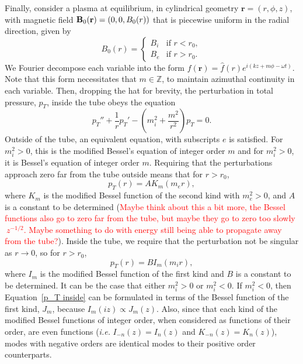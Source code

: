 \documentclass[12pt]{../style-files/ociamthesis}
\begin{document}
Finally, consider a plasma at equilibrium, in cylindrical geometry $\mathbf{r} = (r, \phi, z)$, with magnetic field $\mathbf{B}_0(\mathbf{r}) = (0, 0, B_0(r))$ that is piecewise uniform in the radial direction, given by
\begin{equation}
B_0(r) =
\begin{cases}
B_i & \text{if } r < r_0, \\
B_e & \text{if } r > r_0.
\end{cases}
\end{equation}
We Fourier decompose each variable into the form $f(\mathbf{r}) = \hat{f}(r)e^{i(kz + m\phi - \omega t)}$. Note that this form necessitates that $m \in \mathbb{Z}$, to maintain azimuthal continuity in each variable. Then, dropping the hat for brevity, the perturbation in total pressure, $p_T$, inside the tube obeys the equation
\begin{equation}
	p_T'' + \frac{1}{r}p_T' - (m_i^2 + \frac{m^2}{r^2})p_T = 0.
\end{equation}
Outside of the tube, an equivalent equation, with subscripts $e$ is satisfied. For $m_i^2 > 0$, this is the modified Bessel's equation of integer order $m$ and for $m_i^2 > 0$, it is Bessel's equation of integer order $m$. Requiring that the perturbations approach zero far from the tube outside means that for $r > r_0$,
\begin{equation}
	p_T(r) = A K_m(m_e r), \label{p_T outside}
\end{equation}
where $K_m$ is the modified Bessel function of the second kind with $m_e^2 > 0$, and $A$ is a constant to be determined (\textcolor{red}{Maybe think about this a bit more, the Bessel functions also go to zero far from the tube, but maybe they go to zero too slowly $~z^{-1/2}$. Maybe something to do with energy still being able to propagate away from the tube?}). Inside the tube, we require that the perturbation not be singular as $r \to 0$, so for $r > r_0$,
\begin{equation}
	p_T(r) = B I_m(m_i r), \label{p_T inside}
\end{equation}
where $I_m$ is the modified Bessel function of the first kind and $B$ is a constant to be determined. It can be the case that either $m_i^2 > 0$ or $m_i^2 < 0$. If $m_i^2 < 0$, then Equation~\eqref{p_T inside} can be formulated in terms of the Bessel function of the first kind, $J_m$, because $I_m(iz) \propto J_m(z)$. Also, since that each kind of the modified Bessel functions of integer order, when considered as functions of their order, are even functions (\textit{i.e.} $I_{-n} (z) = I_n(z)$ and $K_{-n} (z) = K_n(z)$), modes with negative orders are identical modes to their positive order counterparts.
\end{document}
